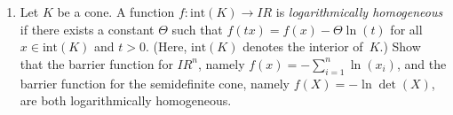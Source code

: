\documentclass[12pt]{article}
\newcommand{\re}{I \!\! R}
\begin{document}
\begin{enumerate}
\item
Let $K$ be a cone. A function $f:\mbox{int}(K) \rightarrow \re$ is
{\em logarithmically homogeneous} if there exists a constant $\Theta$
such that $f(tx)=f(x)-\Theta\ln(t)$ for all $x\in\mbox{int}(K)$ and $t>0$.
(Here, $\mbox{int}(K)$ denotes the interior of~$K$.)
Show that the barrier function for $\re^n$, namely $f(x)=-\sum_{i=1}^n\ln(x_i)$,
and the barrier function for the semidefinite cone, namely $f(X)=-\ln\det(X)$,
are both logarithmically homogeneous.

\end{enumerate}
\end{document}
